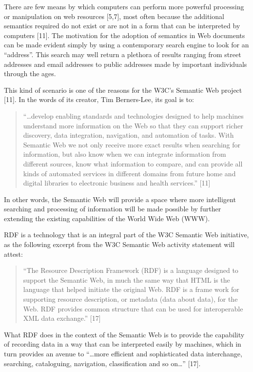 \documentclass{CRPITStyle}
\begin{document}
There are few means by which computers can perform more powerful
processing or manipulation on web resources [5,7], most often because
the additional semantics required do not exist or are not in a form that
can be interpreted by computers [11]. The motivation for the adoption of
semantics in Web documents can be made evident simply by using a
contemporary search engine to look for an ``address''. This search may
well return a plethora of results ranging from street addresses and
email addresses to public addresses made by important individuals
through the ages.

This kind of scenario is one of the reasons for the W3C's Semantic Web
project [11]. In the words of its creator, Tim Berners-Lee, its goal is
to:

\begin{quotation}
	``\ldots{}develop enabling standards and technologies designed to help
	machines understand more information on the Web so that they can
	support richer discovery, data integration, navigation, and
	automation of tasks. With Semantic Web we not only receive more
	exact results when searching for information, but also know when we
	can integrate information from different sources, know what
	information to compare, and can provide all kinds of automated
	services in different domains from future home and digital libraries
	to electronic business and health services.'' [11]
\end{quotation}

In other words, the Semantic Web will provide a space where more
intelligent searching and processing of information will be made
possible by further extending the existing capabilities of the World
Wide Web (WWW).

RDF is a technology that is an integral part of the W3C Semantic Web
initiative, as the following excerpt from the W3C Semantic Web activity
statement will attest:

\begin{quotation}
	``The Resource Description Framework (RDF) is a language designed to
	support the Semantic Web, in much the same way that HTML is the
	language that helped initiate the original Web. RDF is a frame work
	for supporting resource description, or metadata (data about data),
	for the Web. RDF provides common structure that can be used for
	interoperable XML data exchange.'' [17]
\end{quotation}

What RDF does in the context of the Semantic Web is to provide the
capability of recording data in a way that can be interpreted easily by
machines, which in turn provides an avenue to ``\ldots{}more efficient and
sophisticated data interchange, searching, cataloguing, navigation,
classification and so on\ldots{}'' [17].
\end{document}
